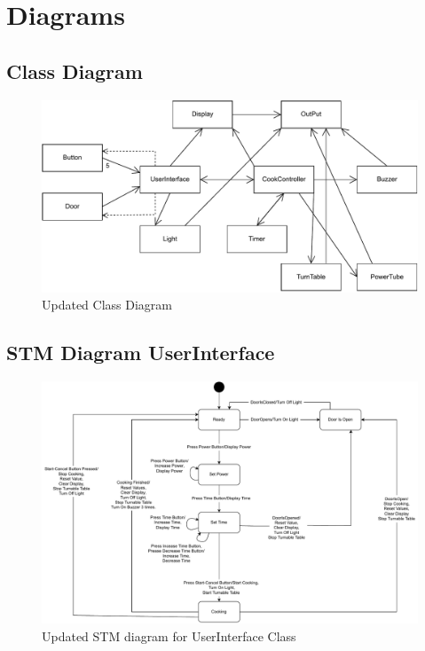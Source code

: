\section{Diagrams}

\subsection{Class Diagram}
\begin{figure}[h]
  \centering
  \includegraphics[scale=0.66]{02-Body/Image/ClassDiagram}
  \caption{Updated Class Diagram}%
  \label{fig:ClassDiagram}
\end{figure}

\newpage

\subsection{STM Diagram UserInterface}
\begin{figure}[h]
  \centering
  \includegraphics[scale=0.6]{02-Body/Image/STM_UserInterfacer.pdf}
  \caption{Updated STM diagram for UserInterface Class}%
  \label{fig:UserInterfaceSTM}
\end{figure}
\newpage
